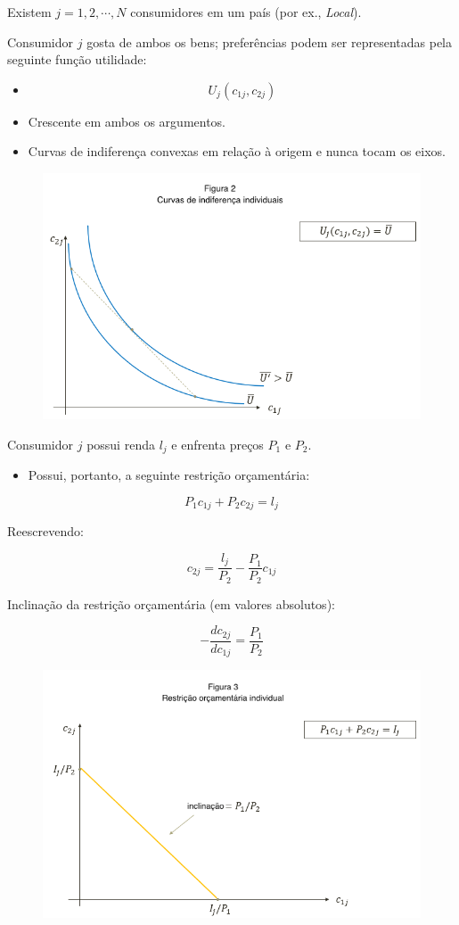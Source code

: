 \documentclass[a4paper,12pt]{article}[abntex2]
\begin{document}
Existem \( j = 1,2, \cdots , N \) consumidores em um país (por ex., \textit{Local}).

Consumidor \( j \) gosta de ambos os bens; preferências podem ser representadas pela seguinte função utilidade:\begin{itemize}
    \item \[
            U_j(c_{1j}, c_{2j})
          \]
    \item Crescente em ambos os argumentos.
    \item Curvas de indiferença convexas em relação à origem e nunca tocam os eixos.
\end{itemize}

\begin{figure}[H]
    \centering
    \includegraphics[width=0.7\linewidth]{Imagens/a9i2.png}
\end{figure}

Consumidor \( j \) possui renda \( l_j \) e enfrenta preços \( P_1 \) e \( P_2 \).

\begin{itemize}
    \item Possui, portanto, a seguinte restrição orçamentária:
\end{itemize}

\[
P_1 c_{1j} + P_2 c_{2j} = l_j
\]

Reescrevendo:

\[
c_{2j} = \frac{l_j}{P_2} - \frac{P_1}{P_2} c_{1j}
\]

Inclinação da restrição orçamentária (em valores absolutos):

\[
- \frac{dc_{2j}}{dc_{1j}} = \frac{P_1}{P_2}
\]

\begin{figure}[H]
    \centering
    \includegraphics[width=0.7\linewidth]{Imagens/a9i3.png}
\end{figure}
\end{document}

